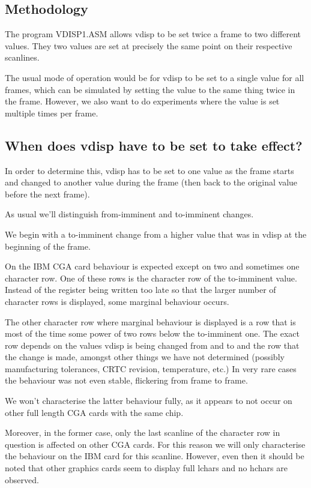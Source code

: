 \documentclass[a4paper,10pt]{amsart}
\begin{document}
\subsection{Methodology}

The program VDISP1.ASM allows vdisp to be set twice a frame to two different
values. They two values are set at precisely the same point on their respective
scanlines.

The usual mode of operation would be for vdisp to be set to a single value for
all frames, which can be simulated by setting the value to the same thing
twice in the frame. However, we also want to do experiments where the value is
set multiple times per frame.

\subsection{When does vdisp have to be set to take effect?}

In order to determine this, vdisp has to be set to one value as the frame
starts and changed to another value during the frame (then back to the
original value before the next frame).

As usual we'll distinguish from-imminent and to-imminent changes.

We begin with a to-imminent change from a higher value that was in vdisp at
the beginning of the frame.

On the IBM CGA card behaviour is expected except on two and sometimes one
character row. One of these rows is the character row of the to-imminent
value. Instead of the register being written too late so that the larger
number of character rows is displayed, some marginal behaviour occurs.

The other character row where marginal behaviour is displayed is a row that
is most of the time some power of two rows below the to-imminent one. The
exact row depends on the values vdisp is being changed from and to and the
row that the change is made, amongst other things we have not determined
(possibly manufacturing tolerances, CRTC revision, temperature, etc.) In
very rare cases the behaviour was not even stable, flickering from frame to
frame.

We won't characterise the latter behaviour fully, as it appears to not occur
on other full length CGA cards with the same chip.

Moreover, in the former case, only the last scanline of the character row in
question is affected on other CGA cards. For this reason we will only
characterise the behaviour on the IBM card for this scanline. However, even
then it should be noted that other graphics cards seem to display full lchars
and no hchars are observed.
\end{document}
